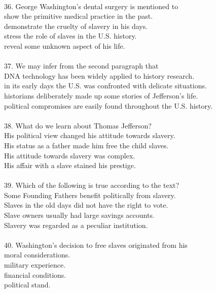 \documentclass[a4paper]{ctexart}
\begin{document}
\\
36.	George Washington’s dental surgery is mentioned to\\
[A] show the primitive medical practice in the past.\\
[B] demonstrate the cruelty of slavery in his days.\\
[C] stress the role of slaves in the U.S. history.\\
[D] reveal some unknown aspect of his life.\\
\\
37.	We may infer from the second paragraph that\\
[A] DNA technology has been widely applied to history research.\\
[B] in its early days the U.S. was confronted with delicate situations.\\
[C] historians deliberately made up some stories of Jefferson’s life.\\
[D] political compromises are easily found throughout the U.S. history.\\
\\
38.	What do we learn about Thomas Jefferson?\\
[A] His political view changed his attitude towards slavery.\\
[B] His status as a father made him free the child slaves.\\
[C] His attitude towards slavery was complex.\\
[D] His affair with a slave stained his prestige.\\
\\
39.	Which of the following is true according to the text?\\
[A] Some Founding Fathers benefit politically from slavery.\\
[B] Slaves in the old days did not have the right to vote.\\
[C] Slave owners usually had large savings accounts.\\
[D] Slavery was regarded as a peculiar institution.\\
\\
40.	Washington’s decision to free slaves originated from his\\
[A] moral considerations.\\
[B] military experience.\\
[C] financial conditions.\\
[D] political stand.\\
\end{document}
